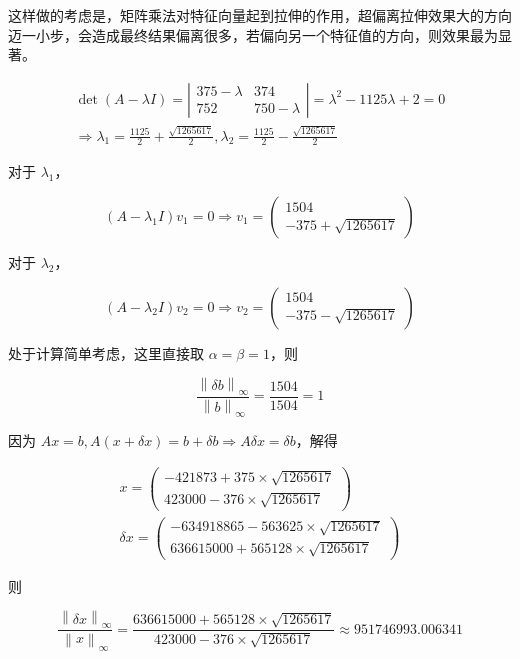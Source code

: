这样做的考虑是，矩阵乘法对特征向量起到拉伸的作用，超偏离拉伸效果大的方向迈一小步，会造成最终结果偏离很多，若偏向另一个特征值的方向，则效果最为显著。

\[\begin{array}{r}
\det(A - \lambda I) = \left| \begin{matrix}
375 - \lambda & 374 \\
752 & 750 - \lambda
\end{matrix} \right| = \lambda^{2} - 1125\lambda + 2 = 0 \\
 \Rightarrow \lambda_{1} = \frac{1125}{2} + \frac{\sqrt{1265617}}{2},\lambda_{2} = \frac{1125}{2} - \frac{\sqrt{1265617}}{2}
\end{array}\]

对于 \(\lambda_{1}\)，

\[\left( A - \lambda_{1}I \right)v_{1} = 0 \Rightarrow v_{1} = \begin{pmatrix}
1504 \\
 - 375 + \sqrt{1265617}
\end{pmatrix}\]

对于 \(\lambda_{2}\)，

\[\left( A - \lambda_{2}I \right)v_{2} = 0 \Rightarrow v_{2} = \begin{pmatrix}
1504 \\
 - 375 - \sqrt{1265617}
\end{pmatrix}\]

处于计算简单考虑，这里直接取 \(\alpha = \beta = 1\)，则

\[\frac{\left\| {\delta b} \right\|_{\infty}}{\left\| b \right\|_{\infty}} = \frac{1504}{1504} = 1\]

因为
\(Ax = b,A(x + \delta x) = b + \delta b \Rightarrow A\delta x = \delta b\)，解得

\[\begin{array}{r}
x = \begin{pmatrix}
 - 421873 + 375 \times \sqrt{1265617} \\
423000 - 376 \times \sqrt{1265617}
\end{pmatrix} \\
\delta x = \begin{pmatrix}
 - 634918865 - 563625 \times \sqrt{1265617} \\
636615000 + 565128 \times \sqrt{1265617}
\end{pmatrix}
\end{array}\]

则

\[\frac{\left\| {\delta x} \right\|_{\infty}}{\left\| x \right\|_{\infty}} = \frac{636615000 + 565128 \times \sqrt{1265617}}{423000 - 376 \times \sqrt{1265617}} \approx 951746993.006341\]

